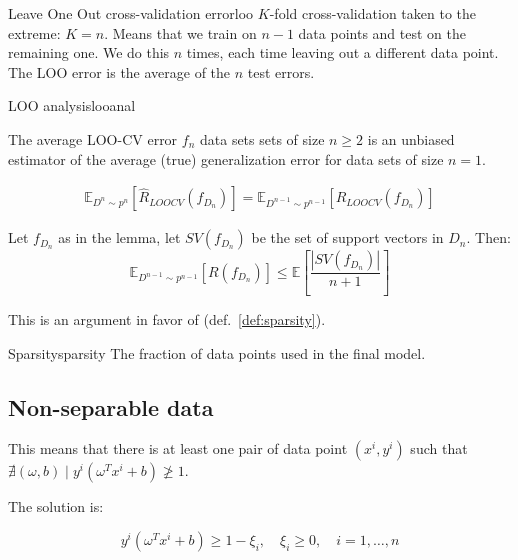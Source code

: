 \begin{definition}{Leave One Out cross-validation error}{loo}
  $K$-fold cross-validation taken to the extreme: $K=n$.
  Means that we train on $n-1$ data points and test on the remaining one.
  We do this $n$ times, each time leaving out a different data point.
  The LOO error is the average of the $n$ test errors.
\end{definition}

\begin{theorem}{LOO analysis}{looanal}
	\begin{lemma}{
			The average LOO-CV error $f_n$ data sets sets of size $n \geq 2$
			is an unbiased estimator of the average (true) generalization
			error for data sets of size $n=1$.
		}

		\begin{align*}
			\mathds{E}_{D^n \sim p^n}
			\left[ \hat{R}_{LOOCV}(f_{D_n}) \right] =
			\mathds{E}_{D^{n-1} \sim p^{n-1}} \left[{R_{LOOCV}(f_{D_n})} \right]
		\end{align*}
	\end{lemma}

	Let $f_{D_n}$ as in the lemma, let $SV(f_{D_n})$ be the set of
	support vectors in $D_n$. Then:
	\begin{equation*}
		\mathds{E}_{D^{n-1} \sim p^{n-1}} \left[{R(f_{D_n})} \right]
		\leq \mathds{E} \left[
			\frac{\left| SV(f_{D_n}) \right|}{n + 1}
			\right]
	\end{equation*}

	This is an argument in favor of  (def.~\ref{def:sparsity}).
\end{theorem}

\begin{definition}{Sparsity}{sparsity}
	The fraction of data points used in the final model.
\end{definition}

\subsection*{Non-separable data}

This means that there is at least one pair of data point $(x^i, y^i)$
such that $\nexists (\omega, b) \mid y^i (\omega^T x^i + b) \ngeq 1$.

The solution is:

\begin{equation*}
	y^i (\omega^T x^i + b) \geq 1 - \xi_i, \quad \xi_i \geq 0,\quad
	i=1,\dots,n
\end{equation*}

